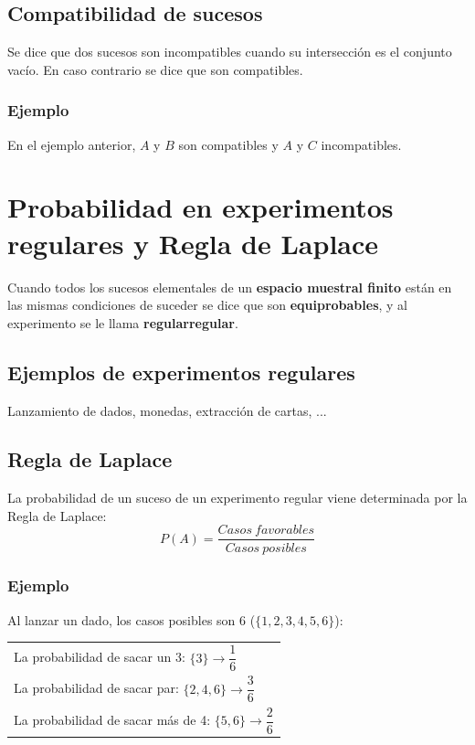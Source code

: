 \documentclass[a4paper,spanish,9pt]{extarticle}
\begin{document}
\begin{multicols*}{2}
\subsection{Compatibilidad de sucesos} Se dice que dos sucesos son incompatibles cuando su intersección es el conjunto vacío. En caso contrario se dice que son compatibles.

\subsubsection{Ejemplo} En el ejemplo anterior, $A$ y $B$ son compatibles y $A$ y $C$ incompatibles.


\section{Probabilidad en experimentos regulares y Regla de Laplace} Cuando todos los sucesos elementales de un \textbf{espacio muestral finito} están en las mismas condiciones de suceder se dice que son \textbf{equiprobables}, y al experimento se le llama \textbf{regularregular}.
\subsection{Ejemplos de experimentos regulares} Lanzamiento de dados, monedas, extracción de cartas, ...

\subsection{Regla de Laplace} La probabilidad de un suceso de un experimento regular viene determinada por la Regla de Laplace:
$$P(A)=\dfrac{Casos\ favorables}{Casos\ posibles} $$
\subsubsection{Ejemplo}
Al lanzar un dado, los casos posibles son 6 ($\lbrace1,2,3,4,5,6\rbrace$):
\begin{tabular}{l}
La probabilidad de sacar un 3: $\lbrace3\rbrace\to \dfrac{1}{6}$\\
La probabilidad de sacar par: $\lbrace2,4,6\rbrace\to\dfrac{3}{6}$ \\
La probabilidad de sacar más de 4: $\lbrace5,6\rbrace\to\dfrac{2}{6}$
\end{tabular}


\end{multicols*}
\end{document}
